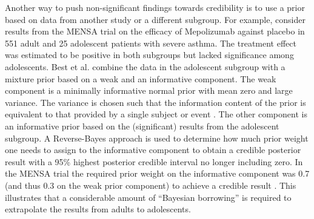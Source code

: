 Another way to push non-significant findings towards credibility is to use a
prior based on data from another study or a different subgroup. For example,
\citet{Best2021} consider results from the MENSA trial \citep{MENSA2014} on the
efficacy of Mepolizumab against placebo in 551 adult and 25 adolescent patients
with severe asthma. The treatment effect was estimated to be positive in both
subgroups but lacked significance among adolescents. Best et al. combine the
data in the adolescent subgroup with a mixture prior based on a weak and an
informative component. The weak component is a minimally informative normal
prior with mean zero and large variance. The variance is chosen such that the
information content of the prior is equivalent to that provided by a single
subject or event \citep[\emph{unit-information prior},][]{Kass1995b}. The other
component is an informative prior based on the (significant) results from the
adolescent subgroup. A Reverse-Bayes approach is used to determine how much
prior weight one needs to assign to the informative component to obtain a
credible posterior result with a 95\% highest posterior credible interval no
longer including zero. In the MENSA trial the required prior weight on the
informative component was 0.7 (and thus 0.3 on the weak prior component) to
achieve a credible result \citep{Best2021}. This illustrates that a considerable
amount of ``Bayesian borrowing'' is required to extrapolate the results from
adults to adolescents.

